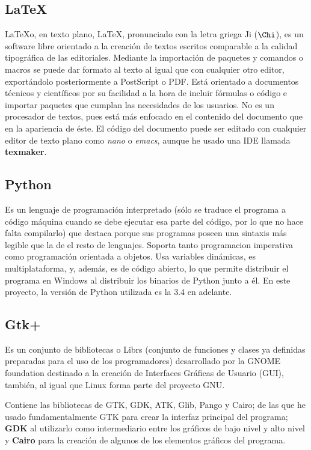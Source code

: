 \documentclass[a4paper, 11pt]{report} %
\begin{document}
\subsection{LaTeX}
\LaTeX\space o, en texto plano, LaTeX, pronunciado con la letra griega 
Ji ($\Chi$), es un software libre orientado a la creación de textos escritos comparable a la calidad tipográfica de las editoriales. Mediante la importación de paquetes y comandos o macros se puede dar formato al texto al igual que con cualquier otro editor, exportándolo posteriormente a PostScript o PDF. Está orientado a documentos técnicos y científicos por su facilidad a la hora de incluir fórmulas o código e importar paquetes que cumplan las necesidades de los usuarios. No es un procesador de textos, pues está más enfocado en el contenido del documento que en la apariencia de éste.
El código del documento puede ser editado con cualquier editor de texto plano como \textit{nano} o \textit{emacs}, aunque he usado una \acrshort{IDE} llamada \textbf{texmaker}.

\subsection{Python}
\label{python}
Es un lenguaje de programación interpretado (sólo se traduce  el programa a código máquina cuando se debe ejecutar esa parte del código, por lo que no hace falta compilarlo) que destaca porque sus programas poseen una sintaxis más legible que la de el resto de lenguajes. Soporta tanto \gls{programacion imperativa} como programación orientada a objetos. Usa variables dinámicas, es multiplataforma, y, además, es de código abierto, lo que permite distribuir el programa en Windows al distribuir los binarios de Python junto a él. En este proyecto, la versión de Python utilizada es la 3.4 en adelante.

\subsection{Gtk+}
Es un conjunto de bibliotecas o \glspl{Libr} (conjunto de funciones y clases ya definidas preparadas para el uso de los programadores) desarrollado por la GNOME foundation destinado a la creación de Interfaces Gráficas de Usuario (\acrshort{GUI}), también, al igual que Linux forma parte del proyecto GNU.

Contiene las bibliotecas de GTK, GDK, ATK, Glib, Pango y Cairo; de las que he usado fundamentalmente GTK para crear la interfaz principal del programa; \textbf{GDK} al utilizarlo como intermediario entre los gráficos de bajo nivel y alto nivel y \textbf{Cairo} para la creación de algunos de los elementos gráficos del programa.
\end{document}
